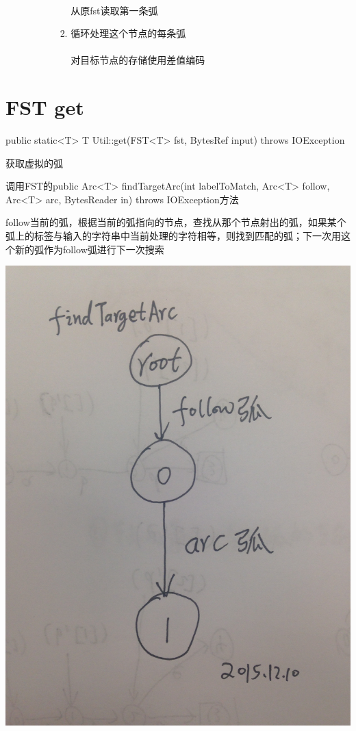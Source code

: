 \documentclass{article}
\begin{document}
\begin{enumerate}
\begin{enumerate}
\begin{enumerate}
\begin{enumerate}
						\paragraph{}
						从原fst读取第一条弧
						\item 循环处理这个节点的每条弧
						\paragraph{}
						对目标节点的存储使用差值编码
					\end{enumerate}
			\end{enumerate}
	\end{enumerate}
\end{enumerate}
\section{FST get}

public static<T> T Util::get(FST<T> fst, BytesRef input) throws IOException


获取虚拟的弧

调用FST的public Arc<T> findTargetArc(int labelToMatch, Arc<T> follow, Arc<T> arc, BytesReader in) throws IOException方法

follow当前的弧，根据当前的弧指向的节点，查找从那个节点射出的弧，如果某个弧上的标签与输入的字符串中当前处理的字符相等，则找到匹配的弧；下一次用这个新的弧作为follow弧进行下一次搜索

\begin{center}
    \includegraphics[width=480pt]{IMG_2012.jpg}
\end{center}
\end{document}
